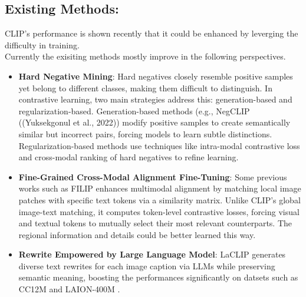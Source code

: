 \documentclass[11pt,letterpaper]{article}
\begin{document}
\subsection{Existing Methods:}
 CLIP's performance is shown recently that it could be enhanced by leverging the difficulty in training.\\
Currently the exisiting methods mostly improve in the following perspectives.\\
\begin{itemize}

    \item \textbf{Hard Negative Mining}: Hard negatives closely resemble positive samples yet belong to different classes, making them difficult to distinguish. In contrastive learning, two main strategies address this: generation-based and regularization-based. Generation-based methods (e.g., NegCLIP\cite{yuksekgonul2023visionlanguagemodelsbehavelike} ((Yuksekgonul et al., 2022)) modify positive samples to create semantically similar but incorrect pairs, forcing models to learn subtle distinctions. Regularization-based methods use techniques like intra-modal contrastive loss and cross-modal ranking of hard negatives to refine learning.

    
    
    \item \textbf{Fine-Grained Cross-Modal Alignment Fine-Tuning}: Some previous works such as FILIP\cite{yao2021filipfinegrainedinteractivelanguageimage}  enhances multimodal alignment by matching local image patches with specific text tokens via a similarity matrix. Unlike CLIP’s global image-text matching, it computes token-level contrastive losses, forcing visual and textual tokens to mutually select their most relevant counterparts. The regional information and details could be better learned this way.
    \item \textbf{Rewrite Empowered by Large Language Model}: LaCLIP generates diverse text rewrites for each image caption via LLMs while preserving semantic meaning, boosting the performances significantly on datsets such as  CC12M and LAION-400M . 
\end{itemize}
\end{document}
